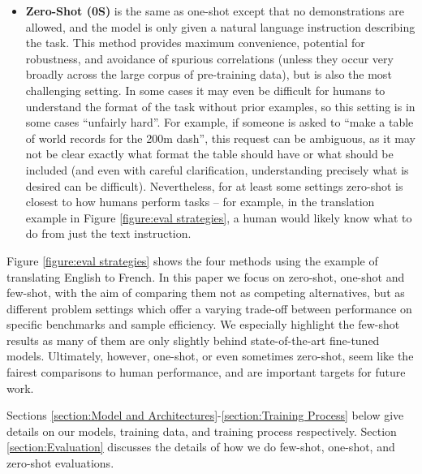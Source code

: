 \begin{itemize}
    \item \textbf{Zero-Shot (0S)} is the same as one-shot except that no demonstrations are allowed, and the model is only given a natural language instruction describing the task.  This method provides maximum convenience, potential for robustness, and avoidance of spurious correlations (unless they occur very broadly across the large corpus of  pre-training data), but is also the most challenging setting.  In some cases it may even be difficult for humans to understand the format of the task without prior examples, so this setting is in some cases ``unfairly hard''.  For example, if someone is asked to ``make a table of world records for the 200m dash'', this request can be ambiguous, as it may not be clear exactly what format the table should have or what should be included (and even with careful clarification, understanding precisely what is desired can be difficult).  Nevertheless, for at least some settings zero-shot is closest to how humans perform tasks -- for example, in the translation example in Figure \ref{figure:eval strategies}, a human would likely know what to do from just the text instruction.
\end{itemize}


Figure \ref{figure:eval strategies} shows the four methods using the example of translating English to French.  In this paper we focus on zero-shot, one-shot and few-shot, with the aim of comparing them not as competing alternatives, but as different problem settings which offer a varying trade-off between performance on specific benchmarks and sample efficiency.  We especially highlight the few-shot results as many of them are only slightly behind state-of-the-art fine-tuned models.  Ultimately, however, one-shot, or even sometimes zero-shot, seem like the fairest comparisons to human performance, and are important targets for future work.

Sections \ref{section:Model and Architectures}-\ref{section:Training Process} below give details on our models, training data, and training process respectively.  
Section \ref{section:Evaluation} discusses the details of how we do few-shot, one-shot, and zero-shot evaluations.
